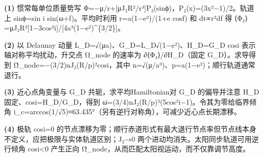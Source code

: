 \par\noindent\textbf{(1)} 惯常每单位质量势写 Φ=−μ/r+[μJ₂R²/r³]P₂(sinϕ)，P₂(x)=(3x²−1)/2。轨道上 sinϕ=sin i sin(ω+f)。平均时利用 r=a(1−e²)/(1+e cosf) 和 dt∝r²df 得 ⟨Φ₂⟩=μJ₂R²[1−3cos²i]/[4a³(1−e²)\textasciicircum{}\{3/2\}]。
\par\noindent\textbf{(2)} 以 Delaunay 动量 L\_D=√(μa)、G\_D=L\_D√(1−e²)、H\_D=G\_D cosi 表示轴对称平均扰动，升交点 Ω\_node 的速率为 ∂⟨Φ₂⟩/∂H\_D（固定 G\_D）。求导得到 Ω̇\_node=−(3/2)nJ₂(R/p)²cosi，其中 n=√(μ/a³)、p=a(1−e²)；顺行轨道通常退行。
\par\noindent\textbf{(3)} 近心点角变量与 G\_D 共轭，求平均Hamiltonian对 G\_D 的偏导并注意 H\_D 固定、cosi=H\_D/G\_D，得到 ω̇=(3/4)nJ₂(R/p)²(5cos²i−1)。令其为零给临界倾角 i\_c=arccos(1/√5)≈63.435°（另有逆行对称角），可减少近心点长期漂移。
\par\noindent\textbf{(4)} 极轨 cosi=0 的节点漂移为零；顺行赤道形式有最大退行节点率但节点线本身不定义，应把极限与实体轨道区别；J₂→0 两个进动均消失。太阳同步轨道可用逆行倾角 cosi<0 产生正向 Ω̇\_node，从而匹配太阳视运动，而不仅靠调节高度。
